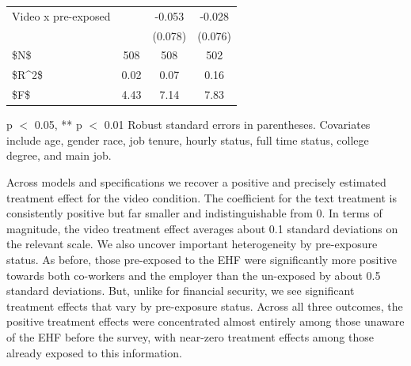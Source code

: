 \documentclass[
  11pt,
  oneside]{article}
\begin{document}
\begin{table}
\begin{threeparttable}
\begin{tabular}[t]{lccc}
\hspace{1em}Video x pre-exposed &  & -0.053 & -0.028\\
\hspace{1em} &  & (0.078) & (0.076)\\
\hspace{1em}\$N\$ & 508 & 508 & 502\\
\hspace{1em}\$R\textasciicircum{}2\$ & 0.02 & 0.07 & 0.16\\
\hspace{1em}\$F\$ & 4.43 & 7.14 & 7.83\\
\bottomrule
\end{tabular}
\begin{tablenotes}
\item * p $<$ 0.05, ** p $<$ 0.01 Robust standard errors in parentheses. Covariates include age, gender race, job tenure, hourly status, full time status, college degree, and main job.
\end{tablenotes}
\end{threeparttable}
\end{table}

Across models and specifications we recover a positive and precisely estimated treatment effect for the video condition. The coefficient for the text treatment is consistently positive but far smaller and indistinguishable from 0. In terms of magnitude, the video treatment effect averages about 0.1 standard deviations on the relevant scale. We also uncover important heterogeneity by pre-exposure status. As before, those pre-exposed to the EHF were significantly more positive towards both co-workers and the employer than the un-exposed by about 0.5 standard deviations. But, unlike for financial security, we see significant treatment effects that vary by pre-exposure status. Across all three outcomes, the positive treatment effects were concentrated almost entirely among those unaware of the EHF before the survey, with near-zero treatment effects among those already exposed to this information.
\end{document}
